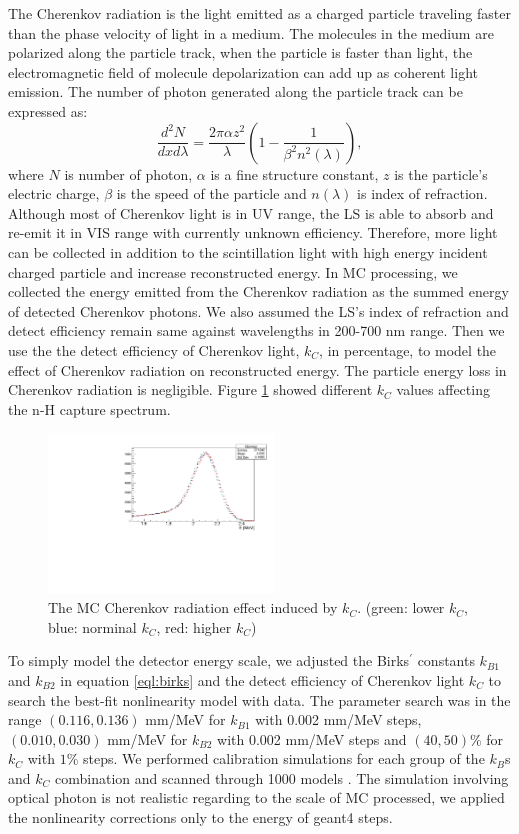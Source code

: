 The Cherenkov radiation is the light emitted as a charged particle traveling faster than the phase velocity of light in a medium. 
The molecules in the medium are polarized along the particle track, when the particle is faster than light, the electromagnetic field of molecule depolarization can add up as coherent light emission. 
The number of photon generated along the particle track can be expressed as:
\begin{equation}
    \frac{d^2N}{dxd\lambda} = \frac{2\pi\alpha z^2}{\lambda}\left(1- \frac{1}{\beta^2n^2(\lambda)}\right),
\end{equation}
where $N$ is number of photon, $\alpha$ is a fine structure constant, $z$ is the particle's electric charge, $\beta$ is the speed of the particle and $n(\lambda)$ is index of refraction.
Although most of Cherenkov light is in UV range, the LS is able to absorb and re-emit it in VIS range with currently unknown efficiency.
Therefore, more light can be collected in addition to the scintillation light with high energy incident charged particle and increase reconstructed energy.
In MC processing, we collected the energy emitted from the Cherenkov radiation as the summed energy of detected Cherenkov photons. 
We also assumed the LS's index of refraction and detect efficiency remain same against wavelengths in 200-700 nm range.
Then we use the the detect efficiency of Cherenkov light, $k_{C}$, in percentage, to model the effect of Cherenkov radiation on reconstructed energy. 
The particle energy loss in Cherenkov radiation is negligible.
Figure \ref{fig:kcplot} showed different $k_{C}$ values affecting the n-H capture spectrum.

\begin{figure}[h!]
\centering
\includegraphics[width=60mm]{Figures/kc.pdf}
\caption{The MC Cherenkov radiation effect induced by $k_{C}$. (green: lower $k_{C}$, blue: norminal $k_{C}$, red: higher $k_{C}$)}
\label{fig:kcplot}
\end{figure}

To simply model the detector energy scale, we adjusted the Birks$^\prime$ constants $k_{B1}$ and $k_{B2}$ in equation \ref{eql:birks} and the detect efficiency of Cherenkov light $k_C$ to search the best-fit nonlinearity model with data. The parameter search was in the range $(0.116, 0.136)$ mm/MeV for $k_{B1}$ with 0.002 mm/MeV steps, $(0.010, 0.030)$ mm/MeV for $k_{B2}$ with 0.002 mm/MeV steps and $(40, 50)\%$ for $k_C$ with $1\%$ steps. 
We performed calibration simulations for each group of the $k_B$s and $k_C$ combination and scanned through 1000 models .
The simulation involving optical photon is not realistic regarding to the scale of MC processed, we applied the nonlinearity corrections only to the energy of geant4 steps.

